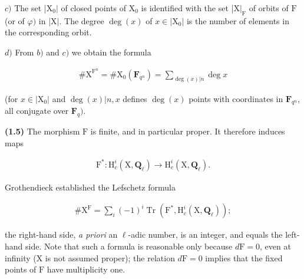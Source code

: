 \documentclass[10pt,leqno]{article}
\begin{document}
\noindent \(c)\) The set |\(\mathrm{X}_{0}|\) of closed points of \(\mathrm{X}_{0}\) is identified with the set |\(\mathrm{X}|_{\mathrm{F}}\) of orbits of \(\mathrm{F}\) (or of \(\varphi )\) in |\(\mathrm{X}|\). The degree \(\operatorname{deg}(x)\) of \(x\in |\mathrm{X}_{0}|\) is the number of elements in the corresponding orbit.\par

\noindent \(d)\) From \(b)\) and \(c)\) we obtain the formula\par

\begin{equation*}\begin{gathered}\# \mathrm{X}^{\mathrm{F}^{n}} = \# \mathrm{X}_{0}(\mathbf{F}_{q^{n}}) = \sum _{\operatorname{deg}(x)|n} \operatorname{deg} x\end{gathered}\tag{1.4.1}\end{equation*}

\noindent (for \(x\in |\mathrm{X}_{0}|\) and \(\operatorname{deg}(x)|n, x\) defines \(\operatorname{deg}(x)\) points with coordinates in \(\mathbf{F}_{q^{n}}\), all conjugate over \(\mathbf{F}_{q})\).\par

\noindent \textbf{(1.5)} The morphism \(\mathrm{F}\) is finite, and in particular proper. It therefore induces maps\par

\begin{equation*}\begin{gathered}\mathrm{F}^{*} : \mathrm{H}_{c}^{i}(\mathrm{X}, \mathbf{Q}_{\ell }) \longrightarrow  \mathrm{H}_{c}^{i}(\mathrm{X}, \mathbf{Q}_{\ell }).\end{gathered}\end{equation*}

\noindent Grothendieck established the Lefschetz formula\par

\begin{equation*}\begin{gathered}\# \mathrm{X}^{\mathrm{F}} = \sum _{i} (- 1)^{i} \operatorname{Tr}(\mathrm{F}^{*}, \mathrm{H}_{c}^{i}(\mathrm{X}, \mathbf{Q}_{\ell }));\end{gathered}\end{equation*}

\noindent the right-hand side, \emph{a priori} an \(\ell \)-adic number, is an integer, and equals the left-hand side. Note that such a formula is reasonable only because \(d\mathrm{F}=0\), even at infinity (\(\mathrm{X}\) is not assumed proper); the relation \(d\mathrm{F}=0\) implies that the fixed points of \(\mathrm{F}\) have multiplicity one.\par
\end{document}
